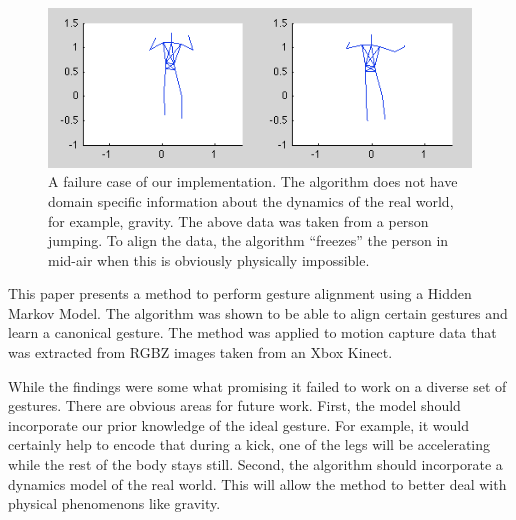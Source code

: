 \documentclass{article}
\begin{document}
\begin{figure}
\begin{centering}
\includegraphics[width=\columnwidth]{figures/jump.png}

\caption{A failure case of our implementation. The algorithm does not have
domain specific information about the dynamics of the real world, for example,
gravity. The above data was taken from a person jumping. To align the data,
the algorithm ``freezes'' the person in mid-air when this is obviously
physically impossible. \label{figure:jump}}

\end{centering}
\end{figure}

This paper presents a method to perform gesture alignment using a Hidden
Markov Model. The algorithm was shown to be able to align certain gestures and
learn a canonical gesture. The method was applied to motion capture data that
was extracted from RGBZ images taken from an Xbox Kinect.

While the findings were some what promising it failed to work on a diverse set
of gestures. There are obvious areas for future work. First, the model should
incorporate our prior knowledge of the ideal gesture. For example, it would
certainly help to encode that during a kick, one of the legs will be
accelerating while the rest of the body stays still. Second, the algorithm
should incorporate a dynamics model of the real world. This will allow the
method to better deal with physical phenomenons like gravity.







\end{document}
